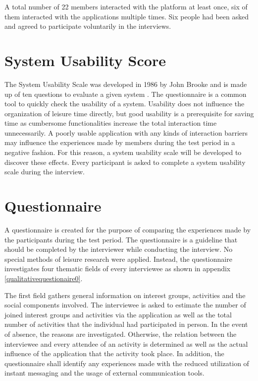 \documentclass[12pt,numbers=noenddot,parskip,bibliography=totocnumbered,listof=totocnumbered,draft]{scrreprt}
\begin{document}
A total number of 22 members interacted with the platform at least once, six of them interacted with the applications multiple times. Six people had been asked and agreed to participate voluntarily in the interviews.

\section{System Usability Score}
The System Usability Scale was developed in 1986 by John Brooke and is made up of ten questions to evaluate a given system \citep[p.189-194]{brooke1996}. The questionnaire is a common tool to quickly check the usability of a system. Usability does not influence the organization of leisure time directly, but good usability is a prerequisite for saving time as cumbersome functionalities increase the total interaction time unnecessarily. A poorly usable application with any kinds of interaction barriers may influence the experiences made by members during the test period in a negative fashion. For this reason, a system usability scale will be developed to discover these effects. Every participant is asked to complete a system usability scale during the interview.

\section{Questionnaire}
A questionnaire is created for the purpose of comparing the experiences made by the participants during the test period. The questionnaire is a guideline that should be completed by the interviewer while conducting the interview. No special methods of leisure research were applied. Instead, the questionnaire investigates four thematic fields of every interviewee as shown in appendix \ref{qualitativequestionaire0}. 

The first field gathers general information on interest groups, activities and the social components involved. The interviewee is asked to estimate the number of joined interest groups and activities via the application as well as the total number of activities that the individual had participated in person. In the event of absence, the reasons are investigated. Otherwise, the relation between the interviewee and every attendee of an activity is determined as well as the actual influence of the application that the activity took place. In addition, the questionnaire shall identify any experiences made with the reduced utilization of instant messaging and the usage of external communication tools. 
\end{document}
